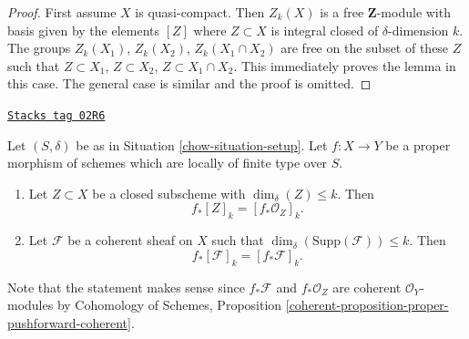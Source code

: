 \begin{proof}
First assume $X$ is quasi-compact. Then $Z_k(X)$ is a free $\mathbf{Z}$-module
with basis given by the elements $[Z]$ where $Z \subset X$ is integral
closed of $\delta$-dimension $k$. The groups
$Z_k(X_1)$, $Z_k(X_2)$, $Z_k(X_1 \cap X_2)$ are free on the subset of these
$Z$ such that $Z \subset X_1$, $Z \subset X_2$, $Z \subset X_1 \cap X_2$.
This immediately proves the lemma in this case. The general case is similar
and the proof is omitted.
\end{proof}

\begin{lemma}
\label{chow-lemma-cycle-push-sheaf}
\href{https://stacks.math.columbia.edu/tag/02R6}{\texttt{Stacks tag 02R6}}

Let $(S, \delta)$ be as in Situation \ref{chow-situation-setup}.
Let $f : X \to Y$ be a proper morphism of schemes which are
locally of finite type over $S$.
\begin{enumerate}
\item Let $Z \subset X$ be a closed subscheme with $\dim_\delta(Z) \leq k$.
Then
$$
f_*[Z]_k = [f_*{\mathcal O}_Z]_k.
$$
\item Let $\mathcal{F}$ be a coherent sheaf on $X$ such that
$\dim_\delta(\text{Supp}(\mathcal{F})) \leq k$. Then
$$
f_*[\mathcal{F}]_k = [f_*{\mathcal F}]_k.
$$
\end{enumerate}
Note that the statement makes sense since $f_*\mathcal{F}$ and
$f_*\mathcal{O}_Z$ are coherent $\mathcal{O}_Y$-modules by
Cohomology of Schemes, Proposition
\ref{coherent-proposition-proper-pushforward-coherent}.
\end{lemma}


